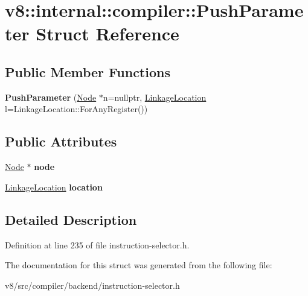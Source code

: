 \hypertarget{structv8_1_1internal_1_1compiler_1_1PushParameter}{}\section{v8\+:\+:internal\+:\+:compiler\+:\+:Push\+Parameter Struct Reference}
\label{structv8_1_1internal_1_1compiler_1_1PushParameter}
\subsection*{Public Member Functions}
\begin{DoxyCompactItemize}
\item 
\mbox{\label{structv8_1_1internal_1_1compiler_1_1PushParameter_aa0d5625691c16432d19a87d57c8faafc}} 
{\bfseries Push\+Parameter} (\mbox{\hyperlink{classv8_1_1internal_1_1compiler_1_1Node}{Node}} $\ast$n=nullptr, \mbox{\hyperlink{classv8_1_1internal_1_1compiler_1_1LinkageLocation}{Linkage\+Location}} l=Linkage\+Location\+::\+For\+Any\+Register())
\end{DoxyCompactItemize}
\subsection*{Public Attributes}
\begin{DoxyCompactItemize}
\item 
\mbox{\label{structv8_1_1internal_1_1compiler_1_1PushParameter_a7354f1b4f050ffb08aa4b4c2eee35819}} 
\mbox{\hyperlink{classv8_1_1internal_1_1compiler_1_1Node}{Node}} $\ast$ {\bfseries node}
\item 
\mbox{\label{structv8_1_1internal_1_1compiler_1_1PushParameter_aa4252be3b4af4f21e650e9496dbdcdba}} 
\mbox{\hyperlink{classv8_1_1internal_1_1compiler_1_1LinkageLocation}{Linkage\+Location}} {\bfseries location}
\end{DoxyCompactItemize}


\subsection{Detailed Description}


Definition at line 235 of file instruction-\/selector.\+h.



The documentation for this struct was generated from the following file\+:\begin{DoxyCompactItemize}
\item 
v8/src/compiler/backend/instruction-\/selector.\+h\end{DoxyCompactItemize}
